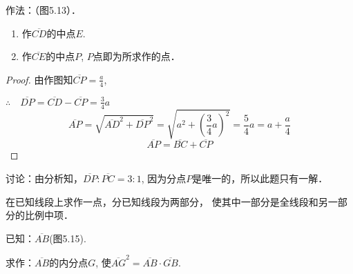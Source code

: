 作法：（图5.13）．

\begin{enumerate}
    \item 作$\overline{CD}$的中点$E$.
    \item 作$\overline{CE}$的中点$P$, $P$点即为所求作的点．
\end{enumerate}

\begin{proof}
    由作图知$\overline{CP}=\frac{a}{4}$,

$\therefore\quad \overline{DP}=\overline{CD}-\overline{CP}=\frac{3}{4}a$
\[\overline{AP}=\sqrt{\overline{AD}^2+\overline{DP}^2}=\sqrt{a^2+\left(\frac{3}{4}a\right)^2}=\frac{5}{4}a=a+\frac{a}{4}\]
\[\overline{AP}=\overline{BC}+\overline{CP}\]
\end{proof}


讨论：由分析知，$\overline{DP}:\overline{PC}=3:1$, 因为分点$P$是唯一的，所以此题只有一解．


\begin{example}
    在已知线段上求作一点，分已知线段为两部分，
    使其中一部分是全线段和另一部分的比例中项．

    已知：$\overline{AB}$(图5.15).

    求作：$\overline{AB}$的内分点$G$, 使$\overline{AG}^2=\overline{AB}\cdot \overline{GB}$.
\end{example}

\begin{figure}[htp]\centering
    \begin{minipage}[t]{0.48\textwidth}
    \centering
{}
    \caption{}
    \end{minipage}
    \begin{minipage}[t]{0.48\textwidth}
    \centering
    \caption{}
    \end{minipage}
    \end{figure}




